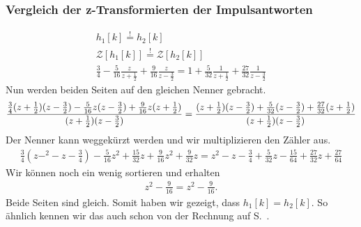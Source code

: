 \documentclass[11pt,a4paper,DIV=12]{scrartcl}
\begin{document}
\subsubsection*{Vergleich der z-Transformierten der Impulsantworten}
%
\begin{gather}
	h_1[k]\overset{!}{=}h_2[k]\\
	\mathcal{Z}[h_1[k]]\overset{!}{=}\mathcal{Z}[h_2[k]]\\
	\frac{3}{4}-\frac{5}{16}\frac{z}{z+\frac{1}{2}}+\frac{9}{16}\frac{z}{z-\frac{3}{2}}
	=1+\frac{5}{32}\frac{1}{z+\frac{1}{2}}+\frac{27}{32}\frac{1}{z-\frac{3}{2}}
\end{gather}
%
Nun werden beiden Seiten auf den gleichen Nenner gebracht.
%
\begin{gather}
	\frac{
		\frac{3}{4}(z+\frac{1}{2})(z-\frac{3}{2})-\frac{5}{16}z(z-\frac{3}{2})+\frac{9}{16}z(z+\frac{1}{2})
	}
	{
		(z+\frac{1}{2})(z-\frac{3}{2})
	}
	=\frac{
		(z+\frac{1}{2})(z-\frac{3}{2})+\frac{5}{32}(z-\frac{3}{2})+\frac{27}{32}(z+\frac{1}{2})
	}
	{
		(z+\frac{1}{2})(z-\frac{3}{2})
	}
\end{gather}
%
Der Nenner kann weggekürzt werden und wir multiplizieren den Zähler aus.
%
\begin{gather}
	\frac{3}{4}(z-^2-z-\frac{3}{4})-\frac{5}{16}z^2+\frac{15}{32}z+\frac{9}{16}z^2+\frac{9}{32}z
	=z^2-z-\frac{3}{4}+\frac{5}{32}z-\frac{15}{64}+\frac{27}{32}z+\frac{27}{64}
\end{gather}
%
Wir können noch ein wenig sortieren und erhalten
%
\begin{gather}
	z^2-\frac{9}{16}=z^2-\frac{9}{16}.
\end{gather}
%
Beide Seiten sind gleich. Somit haben wir gezeigt, dass $h_1[k]=h_2[k]$.
%
So ähnlich kennen wir das auch schon von der Rechnung auf S.~\pageref{eq:H1equalH2}.
%
\renewcommand{\refname}{Buchzitate}

\end{document}
